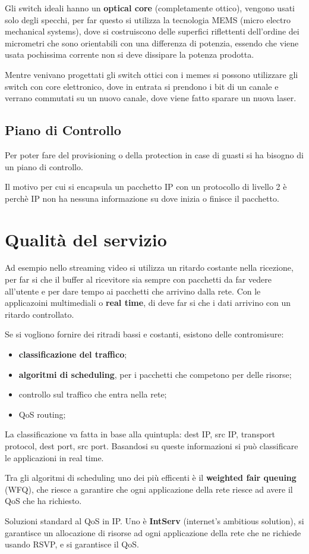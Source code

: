 \documentclass[12pt]{article}
\begin{document}
Gli switch ideali hanno un \textbf{optical core} (completamente ottico), vengono usati solo degli specchi, per far questo si utilizza la tecnologia MEMS (micro electro mechanical systems), dove si costruiscono delle superfici riflettenti dell'ordine dei micrometri che sono orientabili con una differenza di potenzia, essendo che viene usata pochissima corrente non si deve dissipare la potenza prodotta.

Mentre venivano progettati gli switch ottici con i memes si possono utilizzare gli switch con core elettronico, dove in entrata si prendono i bit di un canale e verrano commutati su un nuovo canale, dove viene fatto sparare un nuova laser.


\subsection{Piano di Controllo}
Per poter fare del provisioning o della protection in case di guasti si ha bisogno di un piano di controllo.


Il motivo per cui si encapsula un pacchetto IP con un protocollo di livello 2 \`e perch\`e IP non ha nessuna informazione su dove inizia o finisce il pacchetto.




\newpage
\section{Qualit\`a del servizio}
Ad esempio nello streaming video si utilizza un ritardo costante nella ricezione, per far si che il buffer al ricevitore sia sempre con pacchetti da far vedere all'utente e per dare tempo ai pacchetti che arrivino dalla rete. Con le applicazoini multimediali o \textbf{real time}, di deve far si che i dati arrivino con un ritardo controllato.


Se si vogliono fornire dei ritradi bassi e costanti, esistono delle contromisure:
\begin{itemize}
    \item \textbf{classificazione del traffico};
    \item \textbf{algoritmi di scheduling}, per i pacchetti che competono per delle risorse;
    \item controllo sul traffico che entra nella rete;
    \item QoS routing;
\end{itemize}

La classificazione va fatta in base alla quintupla: dest IP, src IP, transport protocol, dest port, src port. Basandosi su queste informazioni si pu\`o classificare le applicazioni in real time.

Tra gli algoritmi di scheduling uno dei pi\`u efficenti \`e il \textbf{weighted fair queuing} (WFQ), che riesce a garantire che ogni applicazione della rete riesce ad avere il QoS che ha richiesto.


Soluzioni standard al QoS in IP.
Uno \`e \textbf{IntServ} (internet's ambitious solution), si garantisce un allocazione di risorse ad ogni applicazione della rete che ne richiede usando RSVP, e si garantisce il QoS.
\end{document}
